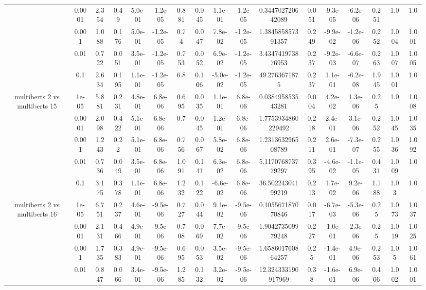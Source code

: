 \begin{tabular}{|c|c|c|c|c|c|c|c|c|c|c|c|c|c|c|c|c|}
 & 0.0001 & 2.354 & 0.49 & 5.0e-01 & -1.2e-05 & 0.881 & 0.045 & 1.1e-01 & -1.2e-05 & 0.344702720642089 & 0.051 & -9.3e-05 & -6.2e-06 & 0.251 & 1.0 & 1.0 \\
 & 0.001 & 1.088 & 0.176 & 5.0e-01 & -1.2e-05 & 0.74 & 0.047 & 7.8e-02 & -1.2e-05 & 1.384585857391357 & 0.249 & -9.9e-02 & -1.2e-06 & 0.252 & 1.004 & 1.001 \\
 & 0.01 & 0.722 & 0.051 & 3.5e-01 & -1.2e-05 & 0.753 & 0.052 & 6.9e-02 & -1.2e-05 & 3.434741973876953 & 0.237 & -9.2e-03 & -6.6e-07 & 0.263 & 1.007 & 1.005 \\
 & 0.1 & 2.634 & 0.195 & 1.1e-01 & -1.2e-05 & 6.8 & 0.106 & -5.0e-02 & -1.2e-05 & 49.2763671875 & 0.237 & 1.1e-01 & -6.2e-08 & 1.945 & 1.001 & 1.0 \\
\hline
\multirow{5}{*}{multiberts 2 vs multiberts 15} & 1e-05 & 5.881 & 0.231 & 4.8e-01 & 6.8e-06 & 0.695 & 0.035 & 1.1e-01 & 6.8e-06 & 0.038495853543281 & 0.004 & 4.2e-02 & 1.3e-06 & 0.25 & 1.0 & 1.008 \\
 & 0.0001 & 2.098 & 0.422 & 5.1e-01 & 6.8e-06 & 0.7 & 0.045 & 1.2e-01 & 6.8e-06 & 1.7753934860229492 & 0.218 & 2.4e-01 & 3.1e-06 & 0.252 & 1.045 & 1.035 \\
 & 0.001 & 1.243 & 0.22 & 5.1e-01 & 6.8e-06 & 0.756 & 0.067 & 5.8e-02 & 6.8e-06 & 1.231363296508789 & 0.211 & 2.6e-01 & -7.3e-07 & 0.255 & 1.036 & 1.092 \\
 & 0.01 & 0.736 & 0.049 & 3.5e-01 & 6.8e-06 & 1.091 & 0.141 & 6.3e-02 & 6.8e-06 & 5.117076873779297 & 0.395 & -4.6e-02 & -1.1e-05 & 0.431 & 1.009 & 1.0 \\
 & 0.1 & 3.175 & 0.378 & 1.1e-01 & 6.8e-06 & 1.232 & 0.122 & -6.6e-02 & 6.8e-06 & 36.50224304199219 & 0.213 & 1.7e-02 & 9.2e-06 & 1.188 & 1.03 & 1.0 \\
\hline
\multirow{5}{*}{multiberts 2 vs multiberts 16} & 1e-05 & 6.751 & 0.237 & 4.6e-01 & -9.5e-06 & 0.727 & 0.044 & 9.1e-02 & -9.5e-06 & 0.105567187070846 & 0.017 & -6.7e-03 & -5.3e-06 & 0.25 & 1.073 & 1.037 \\
 & 0.0001 & 2.131 & 0.466 & 4.9e-01 & -9.5e-06 & 0.708 & 0.069 & 7.7e-02 & -9.5e-06 & 1.904273509979248 & 0.227 & -1.0e-01 & -2.3e-06 & 0.25 & 1.019 & 1.025 \\
 & 0.001 & 1.735 & 0.383 & 4.9e-01 & -9.5e-06 & 0.695 & 0.053 & 3.5e-02 & -9.5e-06 & 1.658601760864257 & 0.25 & -1.4e-01 & 4.9e-06 & 0.253 & 1.05 & 1.061 \\
 & 0.01 & 0.847 & 0.066 & 3.4e-01 & -9.5e-06 & 1.285 & 0.132 & 3.2e-02 & -9.5e-06 & 12.324333190917969 & 0.38 & -1.6e-01 & 6.9e-06 & 0.406 & 1.002 & 1.001 \\

\end{tabular}
